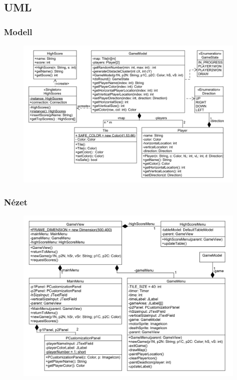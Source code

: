 \documentclass[a4paper,12pt]{article}
\begin{document}
	\subsection{UML}
	\subsubsection{Modell}
	\begin{figure}[H]
		\centering
		\includegraphics[scale=0.25]{model}
	\end{figure}
	\subsubsection{Nézet}
	\begin{figure}[H]
		\centering
		\includegraphics[scale=0.25]{view}
	\end{figure}
\end{document}
